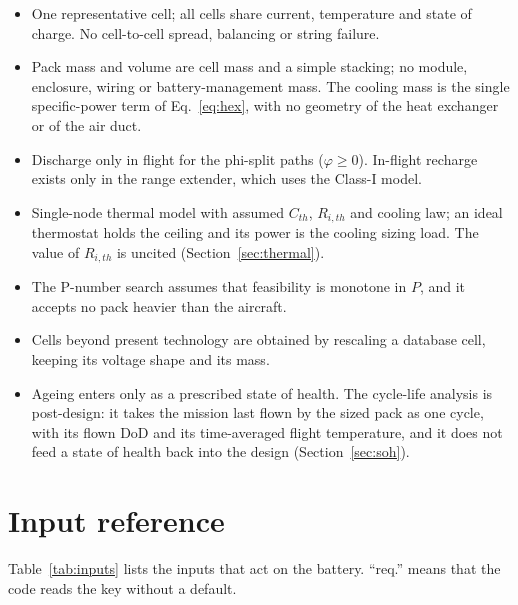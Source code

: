 \documentclass[a4paper,10pt]{article}
\begin{document}
\begin{itemize}
\item One representative cell; all cells share current, temperature and state of charge. No
  cell-to-cell spread, balancing or string failure.
\item Pack mass and volume are cell mass and a simple stacking; no module, enclosure, wiring or
  battery-management mass. The cooling mass is the single specific-power term of
  Eq.~\eqref{eq:hex}, with no geometry of the heat exchanger or of the air duct.
\item Discharge only in flight for the phi-split paths ($\varphi\ge0$). In-flight recharge exists
  only in the range extender, which uses the Class-I model.
\item Single-node thermal model with assumed $C_{th}$, $R_{i,th}$ and cooling law; an ideal
  thermostat holds the ceiling and its power is the cooling sizing load. The value of
  $R_{i,th}$ is uncited (Section~\ref{sec:thermal}).
\item The P-number search assumes that feasibility is monotone in $P$, and it accepts no pack
  heavier than the aircraft.
\item Cells beyond present technology are obtained by rescaling a database cell, keeping its
  voltage shape and its mass.
\item Ageing enters only as a prescribed state of health. The cycle-life analysis is
  post-design: it takes the mission last flown by the sized pack as one cycle, with its
  flown DoD and its time-averaged flight temperature, and it does not feed a state of health back into the
  design (Section~\ref{sec:soh}).
\end{itemize}

\appendix
\section{Input reference}
\label{app:inputs}

Table~\ref{tab:inputs} lists the inputs that act on the battery. ``req.'' means that the code
reads the key without a default.
\end{document}
